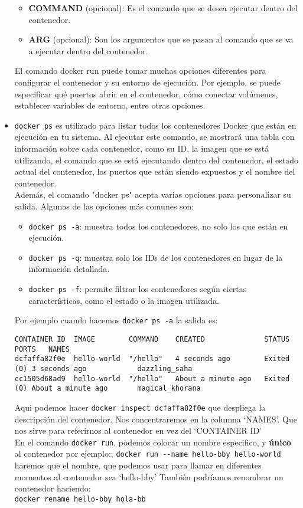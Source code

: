 \documentclass{article}
\begin{document}
\begin{itemize}
\begin{itemize}
      \item \textbf{COMMAND} (opcional): Es el comando que se desea ejecutar dentro del contenedor.

      \item \textbf{ARG} (opcional): Son los argumentos que se pasan al comando que se va a ejecutar dentro del contenedor.
      \end{itemize}

El comando docker run puede tomar muchas opciones diferentes para configurar el contenedor y su entorno de ejecución. Por ejemplo, se puede especificar qué puertos abrir en el contenedor, cómo conectar volúmenes, establecer variables de entorno, entre otras opciones.

\item \lstinline{docker ps} es utilizado para listar todos los contenedores Docker que están en ejecución en tu sistema. Al ejecutar este comando, se mostrará una tabla con información sobre cada contenedor, como su ID, la imagen que se está utilizando, el comando que se está ejecutando dentro del contenedor, el estado actual del contenedor, los puertos que están siendo expuestos y el nombre del contenedor.\\
      Además, el comando "docker ps" acepta varias opciones para personalizar su salida. Algunas de las opciones más comunes son:
      \begin{itemize}
            \item \lstinline{docker ps -a}: muestra todos los contenedores, no solo los que están en ejecución.
            \item \lstinline{docker ps -q}: muestra solo los IDs de los contenedores en lugar de la información detallada.
            \item \lstinline{docker ps -f}: permite filtrar los contenedores según ciertas características, como el estado o la imagen utilizada.
      \end{itemize}
      Por ejemplo cuando hacemos \lstinline{docker ps -a} la salida es:
\begin{lstlisting}[numbers=none]
CONTAINER ID  IMAGE        COMMAND    CREATED              STATUS                      PORTS   NAMES
dcfaffa82f0e  hello-world  "/hello"   4 seconds ago        Exited (0) 3 seconds ago            dazzling_saha
cc1505d68ad9  hello-world  "/hello"   About a minute ago   Exited (0) About a minute ago       magical_khorana
\end{lstlisting}
Aqui podemos hacer \lstinline{docker inspect dcfaffa82f0e} que despliega la descripción del contenedor.
Nos concentraremos en la columna \enquote*{NAMES}.
Que nos sirve para referirnos al contenedor en vez del \enquote*{CONTAINER ID} \\
En el comando \lstinline{docker run}, podemos colocar un nombre especifico, y \textbf{único} al contenedor por ejemplo:: \lstinline{docker run --name hello-bby hello-world} haremos que el nombre, que podemos usar para llamar en diferentes momentos al contenedor sea \enquote*{hello-bby}
También podríamos renombrar un contenedor haciendo:\\ \lstinline{docker rename hello-bby hola-bb}


\end{itemize}
\end{document}
